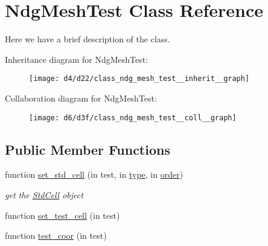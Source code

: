 \hypertarget{class_ndg_mesh_test}{}\section{Ndg\+Mesh\+Test Class Reference}
\label{class_ndg_mesh_test}


Here we have a brief description of the class.  




Inheritance diagram for Ndg\+Mesh\+Test\+:
\nopagebreak
\begin{figure}[H]
\begin{center}
\leavevmode
\texttt{[image: d4/d22/class\_ndg\_mesh\_test\_\_inherit\_\_graph]}
\end{center}
\end{figure}


Collaboration diagram for Ndg\+Mesh\+Test\+:
\nopagebreak
\begin{figure}[H]
\begin{center}
\leavevmode
\texttt{[image: d6/d3f/class\_ndg\_mesh\_test\_\_coll\_\_graph]}
\end{center}
\end{figure}
\subsection*{Public Member Functions}
\begin{DoxyCompactItemize}
\item 
function \hyperlink{class_ndg_mesh_test_afaad8dc5df8b9951b37a3b841e265c53}{set\+\_\+std\+\_\+cell} (in test, in \hyperlink{class_ndg_mesh_test_aa0bfffd8d1b2dd17982b1be00ae680ed}{type}, in \hyperlink{class_ndg_mesh_test_ac593274a823cf315d80afe46652fb0e4}{order})
\begin{DoxyCompactList}\small\item\em get the \hyperlink{class_std_cell}{Std\+Cell} object \end{DoxyCompactList}\item 
function \hyperlink{class_ndg_mesh_test_a9c12eed0b0128306506b8d8a5ccffd9a}{set\+\_\+test\+\_\+cell} (in test)
\item 
function \hyperlink{class_ndg_mesh_test_a757f1cc3da8fe5340994ef04ccb6da18}{test\+\_\+coor} (in test)
\end{DoxyCompactItemize}
